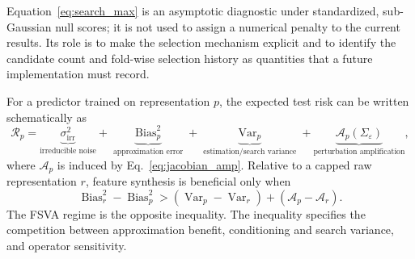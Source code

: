 \documentclass[preprint,12pt]{elsarticle}
\begin{document}
Equation~\eqref{eq:search_max} is an asymptotic diagnostic under standardized, sub-Gaussian null scores; it is not used to assign a numerical penalty to the current results.  Its role is to make the selection mechanism explicit and to identify the candidate count and fold-wise selection history as quantities that a future implementation must record.

For a predictor trained on representation $p$, the expected test risk can be written schematically as \citep{hastie2009,belkin2019}
\begin{equation}
  \mathcal{R}_p
  =\underbrace{\sigma_{\mathrm{irr}}^2}_{\text{irreducible noise}}
  +\underbrace{\operatorname{Bias}_p^2}_{\text{approximation error}}
  +\underbrace{\operatorname{Var}_p}_{\text{estimation/search variance}}
  +\underbrace{\mathcal{A}_p(\Sigma_{\varepsilon})}_{\text{perturbation amplification}},
  \label{eq:risk_decomp}
\end{equation}
where $\mathcal{A}_p$ is induced by Eq.~\eqref{eq:jacobian_amp}.  Relative to a capped raw representation $r$, feature synthesis is beneficial only when
\begin{equation}
  \operatorname{Bias}_{r}^{2}-\operatorname{Bias}_{p}^{2}
  >\left(\operatorname{Var}_{p}-\operatorname{Var}_{r}\right)
   +\left(\mathcal{A}_{p}-\mathcal{A}_{r}\right).
  \label{eq:crossover}
\end{equation}
The FSVA regime is the opposite inequality.  The inequality specifies the competition between approximation benefit, conditioning and search variance, and operator sensitivity.
\end{document}
